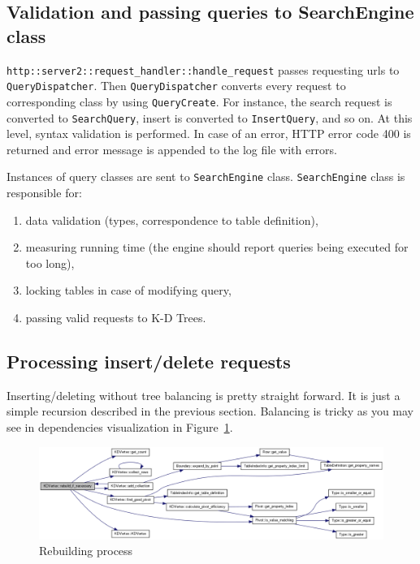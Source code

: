 \documentclass[10pt,a4paper]{article}
\begin{document}
\subsection{Validation and passing queries to SearchEngine class}

\verb|http::server2::request_handler::handle_request| passes requesting urls to \verb|QueryDispatcher|. Then \verb|QueryDispatcher| converts every request to corresponding class by using \verb|QueryCreate|. For instance, the search request is converted to \verb|SearchQuery|, insert is converted to \verb|InsertQuery|, and so on. At this level, syntax validation is performed. In case of an error, HTTP error code 400 is returned and error message is appended to the log file with errors. 

Instances of query classes are sent to \verb|SearchEngine| class. \verb|SearchEngine| class is responsible for:
\begin{enumerate}
\item data validation (types, correspondence to table definition),
\item measuring running time (the engine should report queries being executed for too long),
\item locking tables in case of modifying query,
\item passing valid requests to K-D Trees.
\end{enumerate}

\subsection{Processing insert/delete requests}
\label{chapter:processing}

Inserting/deleting without tree balancing is pretty straight forward. It is just a simple recursion described in the previous section. Balancing is tricky as you may see in dependencies visualization in Figure~\ref{fig:rebuild}.

\begin{figure}[h!]
\centering
  \includegraphics[width=16cm]{rebuild}
  \caption{Rebuilding process}
  \label{fig:rebuild}
\end{figure}
\end{document}
